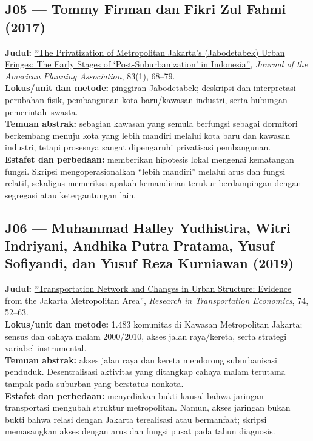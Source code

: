 \documentclass[
  indonesian,
  11pt,
  a4paper,
  oneside,
  openany]{report}
\begin{document}
\subsection{J05 --- Tommy Firman dan Fikri Zul Fahmi
(2017)}\label{j05-tommy-firman-dan-fikri-zul-fahmi-2017}

\textbf{Judul:}
\href{https://doi.org/10.1080/01944363.2016.1249010}{``The Privatization
of Metropolitan Jakarta's (Jabodetabek) Urban Fringes: The Early Stages
of `Post-Suburbanization' in Indonesia''}, \emph{Journal of the American
Planning Association}, 83(1), 68--79.\\
\textbf{Lokus/unit dan metode:} pinggiran Jabodetabek; deskripsi dan
interpretasi perubahan fisik, pembangunan kota baru/kawasan industri,
serta hubungan pemerintah--swasta.\\
\textbf{Temuan abstrak:} sebagian kawasan yang semula berfungsi sebagai
dormitori berkembang menuju kota yang lebih mandiri melalui kota baru
dan kawasan industri, tetapi prosesnya sangat dipengaruhi privatisasi
pembangunan.\\
\textbf{Estafet dan perbedaan:} memberikan hipotesis lokal mengenai
kematangan fungsi. Skripsi mengoperasionalkan ``lebih mandiri'' melalui
arus dan fungsi relatif, sekaligus memeriksa apakah kemandirian terukur
berdampingan dengan segregasi atau ketergantungan lain.

\subsection{J06 --- Muhammad Halley Yudhistira, Witri Indriyani, Andhika
Putra Pratama, Yusuf Sofiyandi, dan Yusuf Reza Kurniawan
(2019)}\label{j06-muhammad-halley-yudhistira-witri-indriyani-andhika-putra-pratama-yusuf-sofiyandi-dan-yusuf-reza-kurniawan-2019}

\textbf{Judul:}
\href{https://doi.org/10.1016/j.retrec.2018.12.003}{``Transportation
Network and Changes in Urban Structure: Evidence from the Jakarta
Metropolitan Area''}, \emph{Research in Transportation Economics}, 74,
52--63.\\
\textbf{Lokus/unit dan metode:} 1.483 komunitas di Kawasan Metropolitan
Jakarta; sensus dan cahaya malam 2000/2010, akses jalan raya/kereta,
serta strategi variabel instrumental.\\
\textbf{Temuan abstrak:} akses jalan raya dan kereta mendorong
suburbanisasi penduduk. Desentralisasi aktivitas yang ditangkap cahaya
malam terutama tampak pada suburban yang berstatus nonkota.\\
\textbf{Estafet dan perbedaan:} menyediakan bukti kausal bahwa jaringan
transportasi mengubah struktur metropolitan. Namun, akses jaringan bukan
bukti bahwa relasi dengan Jakarta terealisasi atau bermanfaat; skripsi
memasangkan akses dengan arus dan fungsi pusat pada tahun diagnosis.
\end{document}
